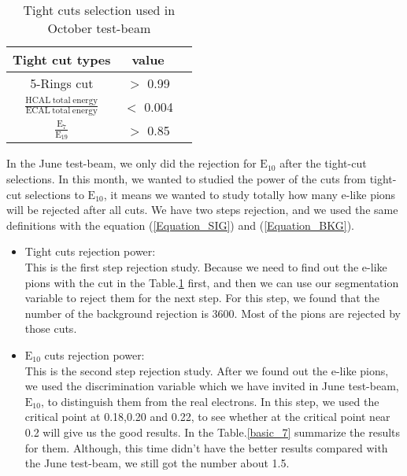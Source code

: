 \documentclass[12pt,twoside,a4paper,an,final]{cms-tdr}
\begin{document}
\begin{table}[h]%
    \centering
    \begin{tabular}{|c|c|c|}
    \hline
    Tight cut types & value\\\hline
    5-Rings cut &  $>$ 0.99 \\\hline  
    $\frac{\mathrm{HCAL  \ total \  energy}}{\mathrm{ECAL \ total \ energy}}$ & $<$ 0.004 \\\hline  
    $\mathrm{\frac{E_{7}}{E_{19}}}$ & $>$ 0.85\\\hline  
        \end{tabular}
    \caption{Tight cuts selection used in October test-beam}\label{basic_100}  %
\end{table}

In the June test-beam, we only did the rejection for $\mathrm{E_{10}}$ after the tight-cut selections. In this month, we wanted to studied the power of the cuts from tight-cut selections to $\mathrm{E_{10}}$, it means we wanted to study totally how many e-like pions will be rejected after all cuts.  We have two steps rejection, and we used the same definitions with the equation (\ref{Equation_SIG}) and (\ref{Equation_BKG}).
\begin{itemize}
\item Tight cuts rejection power: \\ 
This is the first step rejection study. Because we need to find out the e-like pions with the cut in the Table.\ref{basic_100} first, and then we can use our segmentation variable to reject them for the next step.  For this step, we found that the number of the background rejection is 3600. Most of the pions are rejected by those cuts.
\item $\mathrm{E_{10}}$ cuts rejection power:\\
This is the second step rejection study. After we found out the e-like pions, we used the discrimination variable which we have invited in June test-beam,$\mathrm{E_{10}}$, to distinguish them from the real electrons. In this step, we used the critical point at 0.18,0.20 and 0.22, to see whether at the critical point near 0.2 will give us the good results. In the Table.\ref{basic_7} summarize the results for them. 
Although, this time didn't have the better results compared with the June test-beam, we still got the number about 1.5.
\end{itemize}
\end{document}
